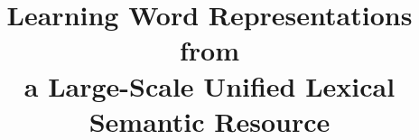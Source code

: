 \documentclass[preprint,12pt]{elsarticle}
\begin{document}
\begin{frontmatter}



\title{Learning Word Representations from \\a Large-Scale Unified Lexical Semantic Resource}


\author{}

\address{}

\begin{abstract}

\end{abstract}

\begin{keyword}


\end{keyword}

\end{frontmatter}

\end{document}
